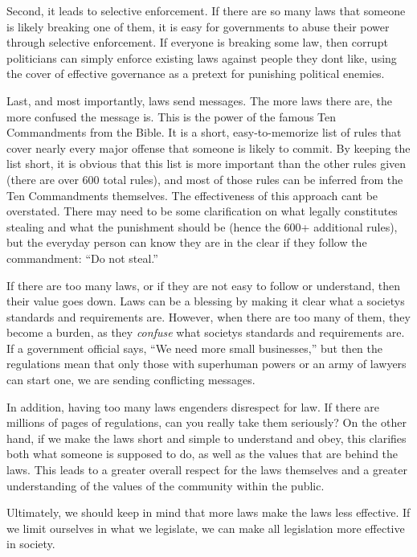 Second, it leads to selective enforcement. If there are so many laws
that someone is likely breaking one of them, it is easy for governments
to abuse their power through selective enforcement. If everyone is
breaking some law, then corrupt politicians can simply enforce existing
laws against people they don{\textquotesingle}t like,
using the cover of
effective governance as a pretext for punishing political enemies.


Last, and most importantly, laws send messages. The more laws there are,
the more confused the message is. This is the power of the famous Ten
Commandments from the Bible. It is a short, easy-to-memorize list of
rules that cover nearly every major offense that someone is likely to
commit. By keeping the list short, it is obvious that this list is more
important than the other rules given (there are over 600 total rules),
and most of those rules can be inferred from the Ten Commandments
themselves. The effectiveness of this approach can{\textquotesingle}t
be overstated. There may need to be some clarification on what legally
constitutes stealing and what the punishment should be (hence the 600+
additional rules), but the everyday person can know they are in the
clear if they follow the commandment: “Do not steal.”  


If there are too many laws, or if they are not easy to follow or
understand, then their value goes down. Laws can be a blessing by
making it clear what a society{\textquotesingle}s standards and
requirements are. However, when there are too many of them, they become
a burden, as they \textit{confuse} what society{\textquotesingle}s
standards and requirements are. If a government official says, “We need
more small businesses,” but then the regulations mean that only those
with superhuman powers or an army of lawyers can start one, we are
sending conflicting messages.


In addition, having too many laws engenders disrespect for law. If there
are millions of pages of regulations, can you really take them
seriously?  On the
other hand, if we make the laws short and simple to understand and
obey, this clarifies both what someone is supposed to do, as well as
the values that are behind
the laws. This leads
to a greater overall respect for the laws themselves and a greater
understanding of the values of the community within the public.


Ultimately, we should
keep in mind that more laws make the laws less effective.  If we limit
ourselves in what we legislate, we can make all legislation more
effective in society. 


